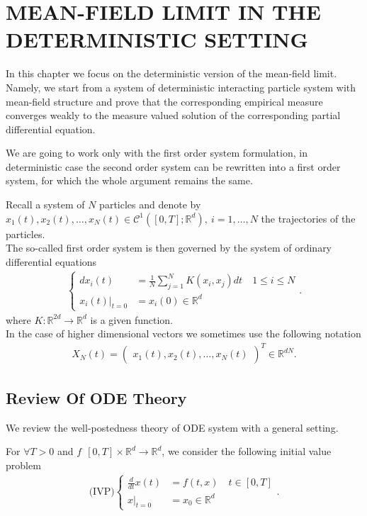 \chapter{MEAN-FIELD LIMIT IN THE DETERMINISTIC SETTING}
In this chapter we focus on the deterministic version of the mean-field limit. Namely, we
start from a system of deterministic interacting particle system with mean-field structure
and prove that the corresponding empirical measure converges weakly to the measure valued solution of 
the corresponding partial differential equation. 

We are going to work only with the first order system formulation, in deterministic case the second order system can be rewritten into a first order system, for which the whole argument remains the same.

Recall a system of $N$ particles and denote by $x_{1}(t),x_{2}(t),\ldots,x_N(t) \in  \mathcal{C}^{1}([0,T];\mathbb{R}^{d} ),\ i=1,\ldots ,N $ 
  the trajectories of the particles.\\[1ex]
 The so-called first order system is then governed by the system of ordinary differential equations 
  \begin{align}\label{MPS1st}
    \begin{cases}
      d x_i(t) &= \frac{1}{N}\sum_{j=1}^{N} K(x_{i},x_{j}) dt  \quad 1\le i \le N \\
        x_i(t)\rvert_{t=0} &= x_i(0) \in \mathbb{R}^{d} 
    \end{cases}
  .\end{align}
  where $K : \mathbb{R}^{2d} \to \mathbb{R}^{d}  $ is a given function.\\[1ex]

In the case of higher dimensional vectors we sometimes  use the following notation 
 \begin{align*}
  X_N(t) = \begin{pmatrix} x_{1}(t),x_2(t),\ldots ,x_N(t) \end{pmatrix}^{T}  \in \mathbb{R}^{dN} 
 .\end{align*}
 
 
\section{Review Of ODE Theory}

We review the well-postedness theory of ODE system with a general setting.

For $\forall T > 0$ and $f\:\ [0,T] \times  \mathbb{R}^{d} \to \mathbb{R}^{d} $, we consider the following initial value problem
  \begin{align}\label{ivp}
    \text{(IVP)} \begin{cases}
     \frac{d}{dt} x(t) &= f(t,x) \quad t \in  [0,T]\\
     x \rvert_{t=0} &= x_{0} \in  \mathbb{R}^d
     \end{cases}
  .\end{align}

